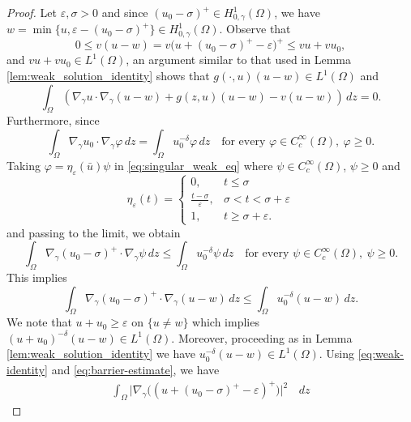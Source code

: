 \documentclass[11pt]{article}
\newcommand{\om} {\Omega}
\newcommand{\gradgr}{\nabla_{\gamma}}
\newcommand{\spacegr}{H^{1}_{0,\gamma}(\Omega)}
\begin{document}
\begin{proof}
Let $\varepsilon,\sigma>0$ and since $(u_{0} - \sigma)^+ \in \spacegr$, we have $w=\min\{u,\varepsilon-(u_{0}-\sigma)^+\}\in \spacegr$. Observe that
\begin{equation*}
0\le v(u-w)
= v\big(u+(u_{0}-\sigma)^+-\varepsilon\big)^+
\le vu+vu_{0},
\end{equation*}
and $vu+vu_{0}\in L^1(\Omega)$, an argument similar to that used in Lemma \ref{lem:weak_solution_identity} shows that $g(\cdot,u)(u-w)\in L^1(\Omega)$ and
\begin{equation}\label{eq:weak-identity}
\int_{\Omega}
\left(
\gradgr u\cdot\gradgr(u-w)
+ g(z,u)(u-w)
- v(u-w)
\right)\,dz
=0 .
\end{equation}
Furthermore, since
\begin{equation}\label{eq:singular_weak_eq}
\int_{\Omega}\gradgr u_{0}\cdot\gradgr\varphi\,dz
=
\int_{\Omega}u_{0}^{-\delta}\varphi\,dz
\quad
\text{for every } \varphi\in C_c^\infty(\Omega),\ \varphi\ge0.
\end{equation}
Taking $\varphi = \eta_{\varepsilon}(\bar{u}) \psi$ in \eqref{eq:singular_weak_eq} where $\psi \in C_{c}^{\infty}(\om)$, $\psi \geq 0$ and 
\begin{equation*}
    \eta_{\varepsilon}(t) = 
    \begin{cases}
        0, & t\leq \sigma \\
        \frac{t-\sigma}{\varepsilon}, & \sigma < t < \sigma + \varepsilon \\
        1, & t \geq \sigma + \varepsilon.
    \end{cases}
\end{equation*}
and passing to the limit, we obtain
\[
\int_{\Omega}\gradgr(u_{0}-\sigma)^+\cdot\gradgr\psi\,dz
\le
\int_{\Omega}u_{0}^{-\delta}\psi\,dz
\quad
\text{for every } \psi\in C_c^\infty(\Omega),\ \psi\ge0.
\]
This implies
\begin{equation}\label{eq:barrier-estimate}
\int_{\Omega}
\gradgr(u_{0}-\sigma)^+\cdot\gradgr(u-w)\,dz
\le
\int_{\Omega}u_{0}^{-\delta}(u-w)\,dz .
\end{equation}
We note that $u+u_{0}\ge\varepsilon$ on $\{u\ne w\}$ which implies $(u+u_{0})^{-\delta}(u-w)\in L^1(\Omega)$. Moreover, proceeding as in Lemma \ref{lem:weak_solution_identity} we have $u_{0}^{-\delta}(u-w)\in L^1(\Omega)$. Using \eqref{eq:weak-identity} and \eqref{eq:barrier-estimate}, we have
\begin{equation*}
\begin{aligned}
\int_{\Omega}
\big|\gradgr\big((u+(u_{0}-\sigma)^+-\varepsilon)^+\big)\big|^2&\,dz

\end{aligned}
\end{equation*}
\end{proof}
\end{document}
